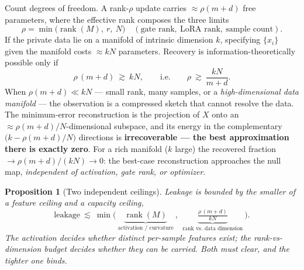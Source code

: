 \documentclass[11pt]{article}
\newtheorem{proposition}{Proposition}
\newcommand{\rank}{\operatorname{rank}}
\begin{document}
Count degrees of freedom. A rank-$\rho$ update carries $\approx\rho(m+d)$ free parameters, where the
effective rank composes the three limits
\begin{equation}
  \rho=\min\big(\rank(M),\ r,\ N\big)\quad(\text{gate rank},\ \text{LoRA rank},\ \text{sample count}).
\end{equation}
If the private data lie on a manifold of intrinsic dimension $k$, specifying $\{x_i\}$ given the
manifold costs $\approx kN$ parameters. Recovery is information-theoretically possible only if
\begin{equation}\label{eq:capacity}
  \rho\,(m+d)\ \gtrsim\ kN,\qquad\text{i.e.}\qquad \rho\ \gtrsim\ \frac{kN}{m+d}.
\end{equation}
When $\rho(m+d)\ll kN$ --- small rank, many samples, or a \emph{high-dimensional data manifold} --- the
observation is a compressed sketch that cannot resolve the data. The minimum-error reconstruction is the
projection of $X$ onto an $\approx\rho(m+d)/N$-dimensional subspace, and its energy in the complementary
$\big(k-\rho(m+d)/N\big)$ directions is \textbf{irrecoverable --- the best approximation there is exactly
zero}. For a rich manifold ($k$ large) the recovered fraction $\to \rho(m+d)/(kN)\to0$: the best-case
reconstruction approaches the null map, \emph{independent of activation, gate rank, or optimizer}.

\begin{proposition}[Two independent ceilings]\label{prop:ceilings}
Leakage is bounded by the smaller of a \emph{feature} ceiling and a \emph{capacity} ceiling,
\begin{equation}
  \text{leakage}\ \lesssim\ \min\Big(\ \underbrace{\rank(M)}_{\text{activation / curvature}}\ ,\ \
  \underbrace{\tfrac{\rho\,(m+d)}{kN}}_{\text{rank vs.\ data dimension}}\ \Big).
\end{equation}
The activation decides whether distinct per-sample features \emph{exist}; the rank-vs-dimension budget
decides whether they can be \emph{carried}. Both must clear, and the tighter one binds.
\end{proposition}
\end{document}
